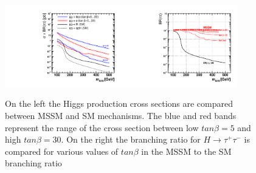 \begin{figure}[htpb]
\begin{center}
\centerline{\includegraphics[width=0.45\textwidth]{plots/cross-sections.pdf}\includegraphics[width=0.45\textwidth]{plots/branching-ratios.pdf}}
\caption{
  On the left the Higgs production cross sections are compared between MSSM and SM mechanisms. The blue and red bands represent the range of the cross section between low $tan\beta = 5$ and high $tan\beta = 30$. On the right the branching ratio for $H\rightarrow\tau^{+}\tau^{-}$ is compared for various values of $tan\beta$ in the MSSM to the SM branching ratio}
\label{fig:mssmcrosssections}
\end{center}
\end{figure}

